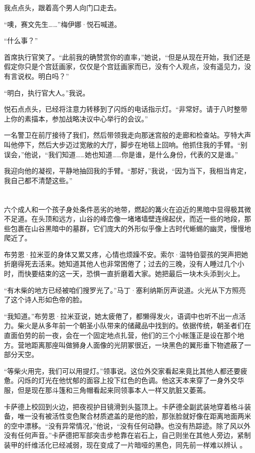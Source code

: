 \documentclass[AutoFakeBold=true]{book}
\begin{document}
我点点头，跟着高个男人向门口走去。

``噢，赛文先生……''梅伊娜·悦石喊道。

``什么事？''

首席执行官笑了。``此前我的确赞赏你的直率，''她说，``但是从现在开始，我们还是假定你只是个宫廷画家，仅仅是个宫廷画家而已，{\kaishu 没有}个人观点，{\kaishu 没有}遥见力，{\kaishu 没有}言说权。明白吗？''

``明白，执行官大人。''我说。

悦石点点头，已经将注意力转移到了闪烁的电话指示灯。``非常好。请于八时整带上你的素描本，参加战略决议中心举行的会议。''

一名警卫在前厅接待了我们，然后带领我走向那迷宫般的走廊和检查站。亨特大声叫他停下，然后大步迈过宽敞的大厅，脚步在地毯上回响。他抓住我的手臂。``别误会，''他说，``我们知道……{\kaishu 她}也知道……你是谁，是什么身份，代表的又是谁。''

我迎向他的凝视，平静地抽回我的手臂。``那好，''我说，``因为当下，我相当肯定，我自己都{\kaishu 不}清楚这些。''

\chapter{}

六个成人和一个孩子身处条件恶劣的地带，燃起的篝火在迫近的黑暗中显得极其微不足道。在头顶和远方，山谷的峰峦像一堵堵墙壁连绵起伏，而近一些的地段，那些包裹在山谷黑暗中的墓群，它们庞大的外形似乎像上古时代蜥蜴的幽灵，慢慢地爬近了。

布劳恩·拉米亚的身体又累又疼，心情也烦躁不安。索尔·温特伯婴孩的哭声把她折磨得死去活来。她知道其他人也非常困倦了；过去的三晚，没有人睡过几个小时，而快要结束的这一天，恐惧一直折磨着大家。她把最后一块木头添到火上。

``有木柴的地方已经被咱们搜罗光了。''马丁·塞利纳斯厉声说道。火光从下方照亮了这个诗人形如色帝的脸。

``我知道。''布劳恩·拉米亚说，她太疲倦了，都懒得发火，语调中也听不出一点活力。柴火是从多年前一个朝圣小队带来的储藏品中找到的。依据传统，朝圣者们在直面伯劳的前一夜，会在一个固定地点扎营，他们的三个小帐篷正是设在那个地方。营地距离那座叫做狮身人面像的光阴冢很近，一块黑色的翼形垂下物遮蔽了一部分天空。

``等柴火用完，我们可以用提灯。''领事说。这位外交家看起来竟比其他人都还要疲惫。闪烁的灯光在他忧郁的面容上投下红色的色调。他这天本来穿了一身外交华服，但是现在那斗篷和三角帽看起来同领事本人一样又肮脏又萎蔫。

卡萨德上校回到火边，把夜视护目镜滑到头盔顶上。卡萨德全副武装地穿着格斗装备，唯一没有被活性变色聚合材质遮盖的是他的脸，那张脸就好像在距离地面两米的空中漂移。``没有异常情况，''他说，``没有任何动静。也没有热踪迹。除了风以外没有任何声音。''卡萨德把军部突击步枪靠在岩石上，自己则坐在其他人旁边，紧制装甲的纤维活化已经减弱，现在变成了一片暗哑的黑色，同先前一样难以辨认 。
\end{document}
